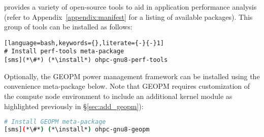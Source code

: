 \OHPC{} provides a variety of open-source tools to aid in application
performance analysis (refer to Appendix~\ref{appendix:manifest} for a listing
of available packages). This group of tools can be installed as follows:

\begin{lstlisting}[language=bash,keywords={},literate={-}{-}1]
# Install perf-tools meta-package
[sms](*\#*) (*\install*) ohpc-gnu8-perf-tools
\end{lstlisting}

\noindent Optionally, the GEOPM power management framework can be installed
using the convenience meta-package below. Note that GEOPM
requires customization of the compute node environment to include an additional
kernel module as highlighted previously in \S\ref{sec:add_geopm}):

\begin{lstlisting}[language=bash,keywords={},upquote=true]
# Install GEOPM meta-package
[sms](*\#*) (*\install*) ohpc-gnu8-geopm

\end{lstlisting}
